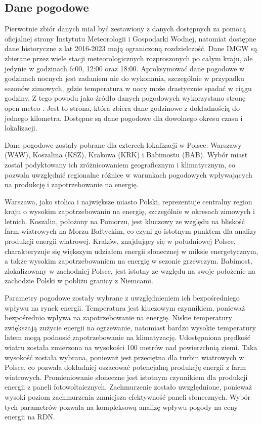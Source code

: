\subsection{Dane pogodowe}
Pierwotnie zbiór danych miał być zestawiony z danych dostępnych za pomocą oficjalnej strony Instytutu Meteorologii i Gospodarki Wodnej, natomiat dostępne dane historyczne z lat 2016-2023 mają ograniczoną rozdzielczość. Dane IMGW są zbierane przez wiele stacji meteorologicznych rozproszonych po całym kraju, ale jedynie w godzinach 6:00, 12:00 oraz 18:00. Aproksymować dane pogodowe w godzinach nocnych jest zadaniem nie do wykonania, szczególnie w przypadku sezonów zimowych, gdzie temperatura w nocy może drastycznie spadać w ciągu godziny. Z tego powodu jako źródło danych pogodowych wykorzystano stronę open-meteo \cite{METEO}. Jest to strona, która zbiera dane godzinowe z dokładnością do jednego kilometra. Dostępne są dane pogodowe dla dowolnego okresu czasu i lokalizacji.

Dane pogodowe zostały pobrane dla czterech lokalizacji w Polsce: Warszawy (WAW), Koszalina (KSZ), Krakowa (KRK) i Babimostu (BAB). Wybór miast został podyktowany ich zróżnicowaniem geograficznym i klimatycznym, co pozwala uwzględnić regionalne różnice w warunkach pogodowych wpływających na produkcję i zapotrzebowanie na energię. 

Warszawa, jako stolica i największe miasto Polski, reprezentuje centralny region kraju o wysokim zapotrzebowaniu na energię, szczególnie w okresach zimowych i letnich. Koszalin, położony na Pomorzu, jest kluczowy ze względu na bliskość farm wiatrowych na Morzu Bałtyckim, co czyni go istotnym punktem dla analizy produkcji energii wiatrowej. Kraków, znajdujący się w południowej Polsce, charakteryzuje się większym udziałem energii słonecznej w miksie energetycznym, a także wysokim zapotrzebowaniem na energię w sezonie grzewczym. Babimost, zlokalizowany w zachodniej Polsce, jest istotny ze względu na swoje położenie na zachodzie Polski w pobliżu granicy z Niemcami.

Parametry pogodowe zostały wybrane z uwzględnieniem ich bezpośredniego wpływu na rynek energii.\newline
Temperatura jest kluczowym czynnikiem, ponieważ bezpośrednio wpływa na zapotrzebowanie na energię. Niskie temperatury zwiększają zużycie energii na ogrzewanie, natomiast bardzo wysokie temperatury latem mogą podnosić zapotrzebowanie na klimatyzację.\newline
Udostępniona prędkość wiatru została zmierzona na wysokości 100 metrów nad powierzchnią ziemi. Taka wysokość została wybrana, ponieważ jest przeciętna dla turbin wiatrowych w Polsce, co pozwala dokładniej oszacować potencjalną produkcję energii z farm wiatrowych.\newline
Promieniowanie słoneczne jest istotnym czynnikiem dla produkcji energii z paneli fotowoltaicznych.\newline
Zachmurzenie zostało uwzględnione, ponieważ wysoki poziom zachmurzenia zmniejsza efektywność paneli słonecznych. 
Wybór tych parametrów pozwala na kompleksową analizę wpływu pogody na ceny energii na RDN.

